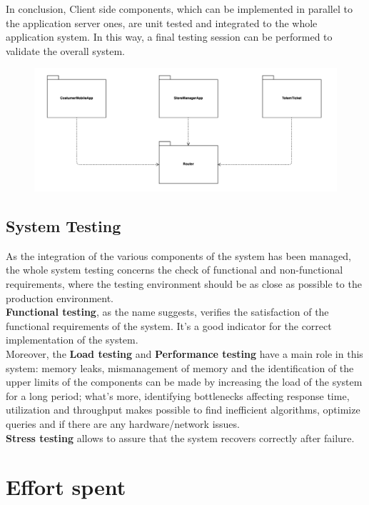 \documentclass[]{article}
\begin{document}
\noindent
In conclusion, Client side components, which can be implemented in parallel to the application server ones, are unit tested and integrated to the whole application system. 
In this way, a final testing session can be performed to validate the overall system.
				\begin{figure}[H]
					\centering
					\includegraphics[scale=0.7]{Testing/Testing7.png}
					\caption{}
					\label{fig:Testing}
				\end{figure}


				\subsection{System Testing}
				\medskip
As the integration of the various components of the system has been managed, the whole system testing concerns the check of functional and non-functional requirements, where the testing environment should be as close as possible to the production environment.\\
\textbf{Functional testing}, as the name suggests, verifies the satisfaction of the functional requirements of the system. It’s a good indicator for the correct implementation of the system.\\
Moreover, the \textbf{Load testing}  and \textbf{Performance testing} have a main role in this system: memory leaks, mismanagement of memory and the identification of the upper limits of the components can be made by increasing the load of the system for a long period; what’s more, identifying bottlenecks affecting response time, utilization and throughput makes possible to find inefficient algorithms, optimize queries and if there are any hardware/network issues.\\
\textbf{Stress testing} allows to assure that the system recovers correctly after failure.\\ \newpage



			 
		\section{Effort spent}
			
\end{document}
